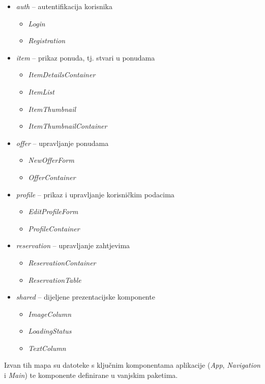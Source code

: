 \documentclass[times, utf8, zavrsni, numeric]{fer}
\begin{document}
\begin{itemize}
  \item \emph{auth} -- autentifikacija korisnika
    \begin{itemize}
      \item \emph{Login}
      \item \emph{Registration}
    \end{itemize}
  \item \emph{item} -- prikaz ponuda, tj. stvari u ponudama
    \begin{itemize}
      \item \emph{ItemDetailsContainer}
      \item \emph{ItemList}
      \item \emph{ItemThumbnail}
      \item \emph{ItemThumbnailContainer}
    \end{itemize}
  \item \emph{offer} -- upravljanje ponudama
    \begin{itemize}
      \item \emph{NewOfferForm}
      \item \emph{OfferContainer}
    \end{itemize}
  \item \emph{profile} -- prikaz i upravljanje korisničkim podacima
    \begin{itemize}
      \item \emph{EditProfileForm}
      \item \emph{ProfileContainer}
    \end{itemize}
  \item \emph{reservation} -- upravljanje zahtjevima
    \begin{itemize}
      \item \emph{ReservationContainer}
      \item \emph{ReservationTable}
    \end{itemize}
  \item \emph{shared} -- dijeljene prezentacijske komponente
    \begin{itemize}
      \item \emph{ImageColumn}
      \item \emph{LoadingStatus}
      \item \emph{TextColumn}
    \end{itemize}
\end{itemize}
Izvan tih mapa su datoteke s ključnim komponentama aplikacije (\emph{App}, \emph{Navigation} i \emph{Main}) te komponente definirane u vanjskim paketima.
\end{document}
